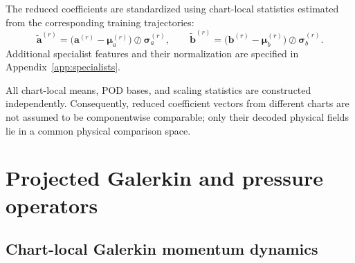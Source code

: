 \documentclass{article}
\begin{document}
The reduced coefficients are standardized using chart-local statistics
estimated from the corresponding training trajectories:
\begin{equation}
    \widetilde{\bm a}^{(r)}
    =
    \bigl(
        \bm a^{(r)}-\bm\mu_a^{(r)}
    \bigr)
    \oslash
    \bm\sigma_a^{(r)},
    \qquad
    \widetilde{\bm b}^{(r)}
    =
    \bigl(
        \bm b^{(r)}-\bm\mu_b^{(r)}
    \bigr)
    \oslash
    \bm\sigma_b^{(r)}.
    \label{eq:app_local_scalers}
\end{equation}
Additional specialist features and their normalization are specified in
Appendix~\ref{app:specialists}.

All chart-local means, POD bases, and scaling statistics are constructed
independently.
Consequently, reduced coefficient vectors from different charts are not
assumed to be componentwise comparable; only their decoded physical fields lie in a common physical comparison space.






\section{Projected Galerkin and pressure operators}
\label{app:rom}

\subsection{Chart-local Galerkin momentum dynamics}
\end{document}
